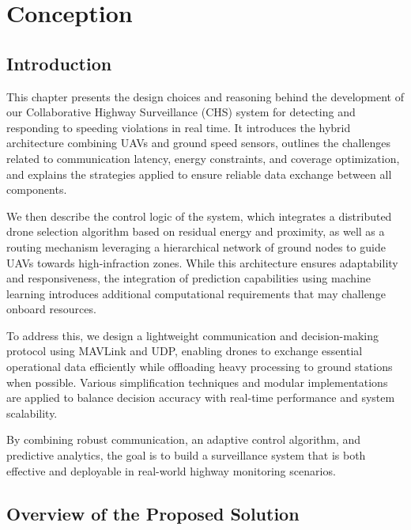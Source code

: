 \chapter{Conception}


\section*{Introduction}

This chapter presents the design choices and reasoning behind the development of our Collaborative Highway Surveillance (CHS) system for detecting and responding to speeding violations in real time. It introduces the hybrid architecture combining UAVs and ground speed sensors, outlines the challenges related to communication latency, energy constraints, and coverage optimization, and explains the strategies applied to ensure reliable data exchange between all components.

We then describe the control logic of the system, which integrates a distributed drone selection algorithm based on residual energy and proximity, as well as a routing mechanism leveraging a hierarchical network of ground nodes to guide UAVs towards high-infraction zones. While this architecture ensures adaptability and responsiveness, the integration of prediction capabilities using machine learning introduces additional computational requirements that may challenge onboard resources.

To address this, we design a lightweight communication and decision-making protocol using MAVLink and UDP, enabling drones to exchange essential operational data efficiently while offloading heavy processing to ground stations when possible. Various simplification techniques and modular implementations are applied to balance decision accuracy with real-time performance and system scalability.

By combining robust communication, an adaptive control algorithm, and predictive analytics, the goal is to build a surveillance system that is both effective and deployable in real-world highway monitoring scenarios.

\section{Overview of the Proposed Solution}
